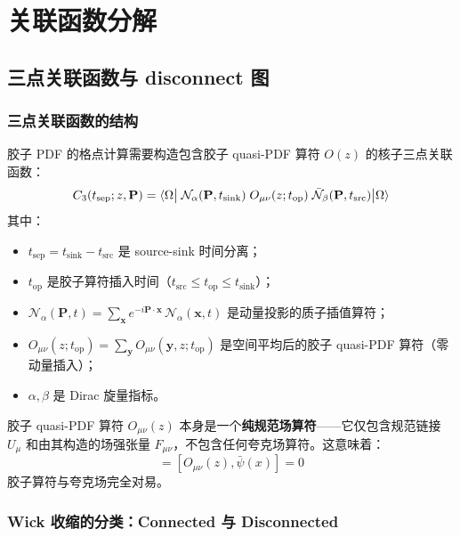 \documentclass[11pt,a4paper]{ctexart}
\newcommand{\Fmunu}{F_{\mu\nu}}
\begin{document}
\section{关联函数分解}

\subsection{三点关联函数与 disconnect 图}

\subsubsection{三点关联函数的结构}

胶子 PDF 的格点计算需要构造包含胶子 quasi-PDF 算符 $O(z)$ 的核子三点关联函数：
\begin{equation}\label{eq:C3_def}
C_3(t_{\text{sep}}; z, \mathbf{P}) =
\braket{\Omega \big|
\;\mathcal{N}_\alpha(\mathbf{P}, t_{\text{sink}}) \;
O_{\mu\nu}(z; t_{\text{op}}) \;
\bar{\mathcal{N}}_\beta(\mathbf{P}, t_{\text{src}})
\big| \Omega}
\end{equation}
其中：
\begin{itemize}
  \item $t_{\text{sep}} = t_{\text{sink}} - t_{\text{src}}$ 是 source-sink 时间分离；
  \item $t_{\text{op}}$ 是胶子算符插入时间（$t_{\text{src}} \le t_{\text{op}} \le t_{\text{sink}}$）；
  \item $\mathcal{N}_\alpha(\mathbf{P}, t) = \sum_{\mathbf{x}} e^{-i\mathbf{P}\cdot\mathbf{x}} \, \mathcal{N}_\alpha(\mathbf{x}, t)$ 是动量投影的质子插值算符；
  \item $O_{\mu\nu}(z; t_{\text{op}}) = \sum_{\mathbf{y}} O_{\mu\nu}(\mathbf{y}, z; t_{\text{op}})$ 是空间平均后的胶子 quasi-PDF 算符（零动量插入）；
  \item $\alpha,\beta$ 是 Dirac 旋量指标。
\end{itemize}

胶子 quasi-PDF 算符 $O_{\mu\nu}(z)$ 本身是一个\textbf{纯规范场算符}——它仅包含规范链接 $U_\mu$ 和由其构造的场强张量 $\Fmunu$，不包含任何夸克场算符。这意味着：
\begin{equation}
[O_{\mu\nu}(z), \psi(x)] = [O_{\mu\nu}(z), \bar{\psi}(x)] = 0
\end{equation}
胶子算符与夸克场完全对易。

\subsubsection{Wick 收缩的分类：Connected 与 Disconnected}
\end{document}
